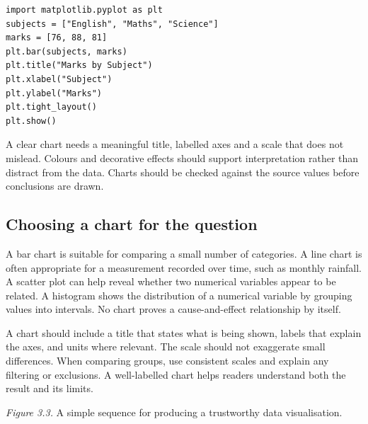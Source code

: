 \documentclass[11pt,openany,oneside]{book}
\begin{document}
\begin{lstlisting}[style=pythonstyle]
import matplotlib.pyplot as plt
subjects = ["English", "Maths", "Science"]
marks = [76, 88, 81]
plt.bar(subjects, marks)
plt.title("Marks by Subject")
plt.xlabel("Subject")
plt.ylabel("Marks")
plt.tight_layout()
plt.show()
\end{lstlisting}
A clear chart needs a meaningful title, labelled axes and a scale that does not mislead. Colours and decorative effects should support interpretation rather than distract from the data. Charts should be checked against the source values before conclusions are drawn.

\subsection{Choosing a chart for the question}
A bar chart is suitable for comparing a small number of categories. A line chart is often appropriate for a measurement recorded over time, such as monthly rainfall. A scatter plot can help reveal whether two numerical variables appear to be related. A histogram shows the distribution of a numerical variable by grouping values into intervals. No chart proves a cause-and-effect relationship by itself.

A chart should include a title that states what is being shown, labels that explain the axes, and units where relevant. The scale should not exaggerate small differences. When comparing groups, use consistent scales and explain any filtering or exclusions. A well-labelled chart helps readers understand both the result and its limits.

\begin{center}
\end{center}
\textit{Figure 3.3.} A simple sequence for producing a trustworthy data visualisation.
\end{document}
